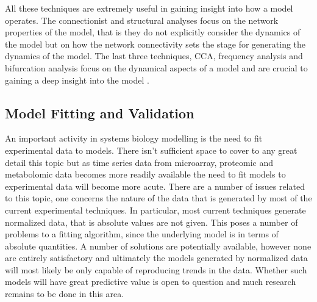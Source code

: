 \documentclass[12pt]{article}
\begin{document}
{All these techniques are extremely useful in gaining insight into how a model operates. The connectionist and structural analyses focus on the network properties of the model, that is they
do not explicitly consider the dynamics of the model but on how the network connectivity sets the stage for generating the dynamics of the model. The last three techniques, CCA, frequency analysis and bifurcation analysis focus on the dynamical aspects of a model and are crucial to
gaining a deep insight into the model \cite{Bakker:1997,TysonNatReview2001}.

\subsection{Model Fitting and Validation}

An important activity in systems biology modelling is the need to fit experimental data
to models. There isn't sufficient space to cover to any great detail this topic but as
time series data from microarray, proteomic and metabolomic data becomes more readily available
the need to fit models to experimental data will become more acute. There are a number of issues
related to this topic, one concerns the nature of the data that is generated by most of the current experimental techniques. In particular, most current techniques generate normalized data, that is absolute values are not given. This poses a number of problems to a fitting
algorithm, since the underlying model is in terms of absolute quantities. A number of solutions
are potentially available, however none are entirely satisfactory and ultimately the models generated by normalized data will most likely be only capable of reproducing trends in the
data. Whether such models will have great predictive value is open to question and much research remains to be done in this area.

}
\end{document}
